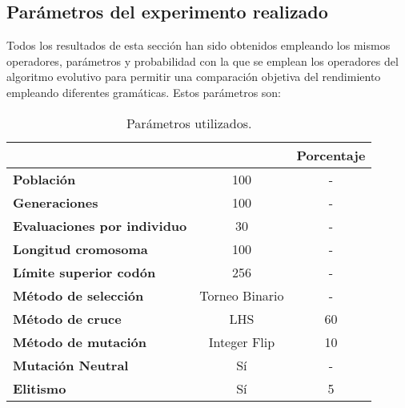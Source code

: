 \subsection{Parámetros del experimento realizado} \label{sec:params}
Todos los resultados de esta sección han sido obtenidos empleando los mismos operadores, parámetros y probabilidad con la que se emplean los operadores del algoritmo evolutivo para permitir una comparación objetiva del rendimiento empleando diferentes gramáticas. Estos parámetros son:
\begin{table}[H]
\centering
\begin{tabular}{lc|c|}
\cline{3-3}
\textbf{}                                                                & \multicolumn{1}{l|}{\textbf{}}     & \multicolumn{1}{l|}{\textbf{Porcentaje}} \\ \hline
\multicolumn{1}{|l|}{\textbf{Población}}                                 & 100                                & -                                        \\ \hline
\multicolumn{1}{|l|}{\textbf{Generaciones}}                              & 100                                & -                                        \\ \hline
\multicolumn{1}{|l|}{\textbf{Evaluaciones por individuo}}                & 30                                 & -                                        \\ \hline
\multicolumn{1}{|l|}{\textbf{Longitud cromosoma}}                        & 100                                & -                                        \\ \hline
\multicolumn{1}{|l|}{\textbf{Límite superior codón\footnotemark[2]}} & 256                                & -                                        \\ \hline
\multicolumn{1}{|l|}{\textbf{Método de selección}}                       & Torneo Binario\footnotemark[3] & -                                        \\ \hline
\multicolumn{1}{|l|}{\textbf{Método de cruce}}                           & LHS                                & 60                                       \\ \hline
\multicolumn{1}{|l|}{\textbf{Método de mutación}}                        & Integer Flip                       & 10                                       \\ \hline
\multicolumn{1}{|l|}{\textbf{Mutación Neutral}}                          & Sí                                 & -                                        \\ \hline
\multicolumn{1}{|l|}{\textbf{Elitismo}}                                  & Sí                                 & 5                                        \\ \hline
\end{tabular}
\caption{Parámetros utilizados.}
\end{table}

